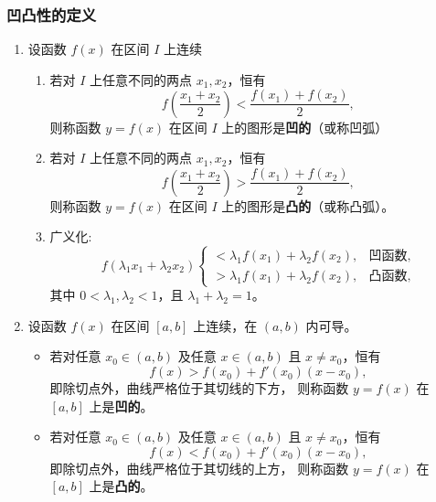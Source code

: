 \documentclass[../book.tex]{subfiles}
\begin{document}
    \subsubsection{凹凸性的定义}
    \begin{enumerate}
        \item \begin{definition}
                  设函数 $f(x)$ 在区间 $I$ 上连续
                  \begin{enumerate}
                      \item 若对 $I$ 上任意不同的两点 $x_1,x_2$，恒有
                      \[
                          f\!\left(\frac{x_1+x_2}{2}\right) < \frac{f(x_1)+f(x_2)}{2},
                      \]
                      则称函数 $y=f(x)$ 在区间 $I$ 上的图形是\textbf{凹的}（或称凹弧）

                      \item 若对 $I$ 上任意不同的两点 $x_1,x_2$，恒有
                      \[
                          f\!\left(\frac{x_1+x_2}{2}\right) > \frac{f(x_1)+f(x_2)}{2},
                      \]
                      则称函数 $y=f(x)$ 在区间 $I$ 上的图形是\textbf{凸的}（或称凸弧）。
                      \item 广义化:
                      \[
                          f(\lambda_1 x_1 + \lambda_2 x_2)
                          \begin{cases}
                              < \lambda_1 f(x_1) + \lambda_2 f(x_2), & \text{凹函数},\\
                              > \lambda_1 f(x_1) + \lambda_2 f(x_2), & \text{凸函数},
                          \end{cases}
                      \]
                      其中 $0 < \lambda_1,\lambda_2 < 1$，且 $\lambda_1+\lambda_2=1$。
                  \end{enumerate}
        \end{definition}
        \item 设函数 $f(x)$ 在区间 $[a,b]$ 上连续，在 $(a,b)$ 内可导。

        \begin{itemize}
            \item 若对任意 $x_0\in(a,b)$ 及任意 $x\in(a,b)$ 且 $x\neq x_0$，恒有
            \[
                f(x) > f(x_0) + f'(x_0)(x - x_0),
            \]
            即除切点外，曲线严格位于其切线的下方，
            则称函数 $y=f(x)$ 在 $[a,b]$ 上是\textbf{凹的}。

            \item 若对任意 $x_0\in(a,b)$ 及任意 $x\in(a,b)$ 且 $x\neq x_0$，恒有
            \[
                f(x) < f(x_0) + f'(x_0)(x - x_0),
            \]
            即除切点外，曲线严格位于其切线的上方，
            则称函数 $y=f(x)$ 在 $[a,b]$ 上是\textbf{凸的}。
        \end{itemize}
    \end{enumerate}
\end{document}
